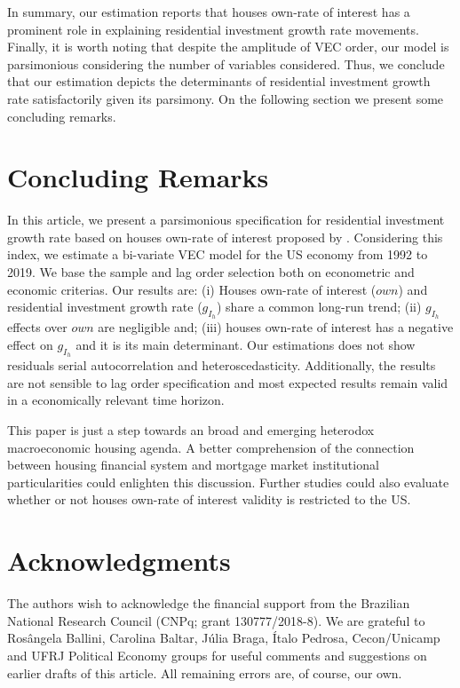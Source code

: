 \documentclass[12pt, a4paper]{article}
\begin{document}
In summary, our estimation reports that houses own-rate of interest has a prominent role in explaining residential investment growth rate movements.
Finally, it is worth noting that despite the amplitude of VEC order, our model is parsimonious considering the number of variables considered.
Thus, we conclude that our estimation depicts the determinants of residential investment growth rate satisfactorily given its parsimony.
On the following section we present some concluding remarks.

\section{Concluding Remarks}
\label{sec:orgf982cd3}
\label{sec:Conclusion}
In this article, we present a parsimonious specification for residential investment growth rate based on houses own-rate of interest proposed by \textcite{teixeira_crescimento_2015}.
Considering this index, we estimate a bi-variate VEC model for the US economy from 1992 to 2019.
We base the sample and lag order selection both on econometric and economic criterias.
Our results are:
	(i) Houses own-rate of interest (\(own\)) and residential investment growth rate (\(g_{I_h}\)) share a common long-run trend;
	(ii) \(g_{I_h}\) effects over \(own\) are negligible and; 
	(iii) houses own-rate of interest has a negative effect on \(g_{I_h}\) and it is its main determinant.
Our estimations does not show residuals serial autocorrelation and heteroscedasticity.
Additionally, the results are not sensible to lag order specification and most expected results remain valid in a economically relevant time horizon.

This paper is just a step towards an broad and emerging heterodox macroeconomic housing agenda.
A better comprehension of the connection between housing financial system and mortgage market institutional particularities could enlighten this discussion.
Further studies could also evaluate whether or not houses own-rate of interest validity is restricted to the US.


\section*{Acknowledgments}
\label{sec:orga2f6b56}
\noindent The authors wish to acknowledge the financial support from the Brazilian National Research Council (CNPq; grant 130777/2018-8). We are grateful to Rosângela Ballini, Carolina Baltar, Júlia Braga, Ítalo Pedrosa, Cecon/Unicamp and UFRJ Political Economy groups for useful comments and suggestions on earlier drafts of this article. All remaining errors are, of course, our own.
\end{document}
